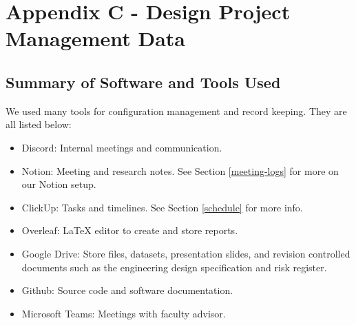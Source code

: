 \documentclass[a4paper,11pt]{article}
\begin{document}
\section{Appendix C - Design Project Management Data}
\label{appendix-c}

\subsection{Summary of Software and Tools Used}
We used many tools for configuration management and record keeping. They are all listed below:
\begin{itemize}
    \item Discord: Internal meetings and communication.
    \item Notion: Meeting and research notes. See Section \ref{meeting-logs} for more on our Notion setup.
    \item ClickUp: Tasks and timelines. See Section \ref{schedule} for more info.
    \item Overleaf: LaTeX editor to create and store reports.
    \item Google Drive: Store files, datasets, presentation slides, and revision controlled documents such as the engineering design specification and risk register.
    \item Github: Source code and software documentation.
    \item Microsoft Teams: Meetings with faculty advisor.
\end{itemize}
\end{document}
